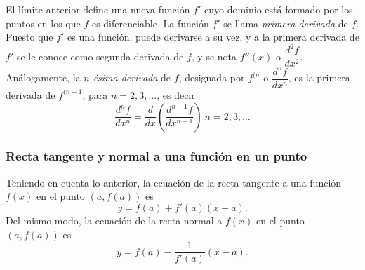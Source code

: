 \documentclass[a4paper]{article}
\begin{document}
El límite anterior define una nueva función $f'$ cuyo dominio está formado por los
puntos en los que $f$ es diferenciable. La función $f'$ se llama \emph{primera
derivada} de $f$. Puesto que $f'$ es una función, puede derivarse a su vez, y a
la primera derivada de $f'$ se le conoce como segunda derivada de $f$, y se
nota $f''(x)$ o $\dfrac{d^2f}{dx^2}$. Análogamente, la \emph{$n$-ésima
derivada} de $f$, designada por $f^{(n}$ o $\dfrac{d^nf}{dx^n}$, es la primera
derivada de $f^{(n-1}$, para $n=2,3,\ldots$, es decir
\[
\frac{d^nf}{dx^n}=\frac{d}{dx}\left(\frac{d^{n-1}f}{dx^{n-1}}\right)\
n=2,3,\ldots
\]

\subsubsection*{Recta tangente y normal a una función en un punto}
Teniendo en cuenta lo anterior, la ecuación de la recta tangente a una función
$f(x)$ en el punto $(a,f(a))$ es
\[
y=f(a)+f'(a)(x-a).
\]
Del mismo modo, la ecuación de la recta normal a $f(x)$ en el punto $(a,f(a))$
es
\[
y=f(a)-\frac{1}{f'(a)}(x-a).
\]
\end{document}
